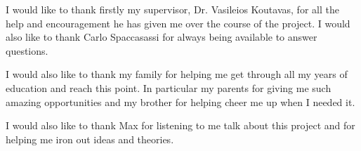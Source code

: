 
\begin{thesisacknowledgments}                     %
I would like to thank firstly my supervisor, Dr. Vasileios Koutavas, for all the help and encouragement he has given me over the course of the project. I would also like to thank Carlo Spaccasassi for always being available to answer questions. 

I would also like to thank my family for helping me get through all my years of education and reach this point. In particular my parents for giving me such amazing opportunities and my brother for helping cheer me up when I needed it. 

I would also like to thank Max for listening to me talk about this project and for helping me iron out ideas and theories.                           %
\end{thesisacknowledgments}                       %